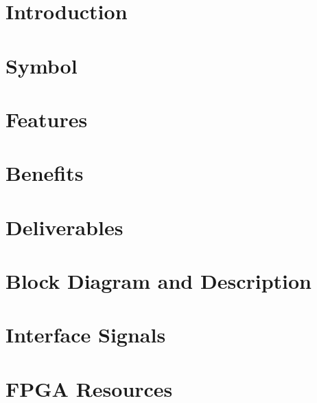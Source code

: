 \documentclass{../../submodules/TEX/document/ug/ug}
\begin{document}
\maketitle
\cleardoublepage
\tableofcontents
\listoftables
\listoffigures
\cleardoublepage

\section{Introduction}


\section{Symbol}


\section{Features}


\section{Benefits}


\section{Deliverables}


\section{Block Diagram and Description}


\section{Interface Signals}


\ifnum{}

\fi


\ifnum{}

\fi

\ifnum{}

\fi

\ifnum{}

\fi

\section*{FPGA Resources}


%
%
\end{document}
